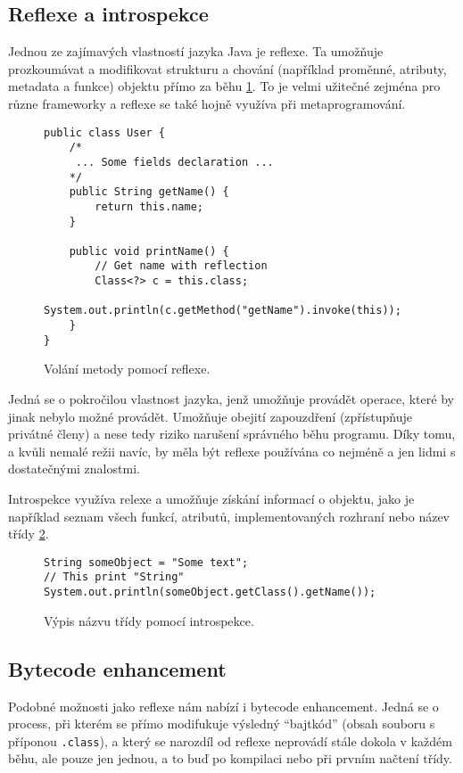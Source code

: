 \subsection{Reflexe a introspekce}
Jednou ze zajímavých vlastností jazyka Java je reflexe. Ta umožňuje prozkoumávat a modifikovat strukturu a chování (například proměnné, atributy, metadata a funkce) objektu přímo za běhu \ref{code:java:reflection}.
To je velmi užitečné zejména pro různe frameworky a reflexe se také hojně využíva při metaprogramování. 
\begin{figure}[!h]
\begin{lstlisting}
public class User {
    /*
     ... Some fields declaration ...
    */
    public String getName() {
        return this.name;
    }
    
    public void printName() {
        // Get name with reflection
        Class<?> c = this.class;
        System.out.println(c.getMethod("getName").invoke(this));
    }
}
\end{lstlisting}
\caption{Volání metody pomocí reflexe.}
\label{code:java:reflection}
\end{figure}

Jedná se o pokročilou vlastnost jazyka, jenž umožňuje provádět operace, které by jinak nebylo možné provádět. Umožňuje obejití zapouzdření (zpřístupňuje privátné členy) a nese tedy riziko narušení správného běhu programu. Díky tomu, a kvůli nemalé režii navíc, by měla být reflexe používána co nejméně a jen lidmi s dostatečnými znalostmi.

Introspekce využíva relexe a umožňuje získání informací o objektu, jako je například seznam všech funkcí, atributů, implementovaných rozhraní nebo název třídy \ref{code:java:introspection}.
\begin{figure}[!h]
\begin{lstlisting}
String someObject = "Some text";
// This print "String"
System.out.println(someObject.getClass().getName());
\end{lstlisting}
\caption{Výpis názvu třídy pomocí introspekce.}
\label{code:java:introspection}
\end{figure}
\subsection{Bytecode enhancement}
Podobné možnosti jako reflexe nám nabízí i bytecode enhancement. Jedná se o process, při kterém se přímo modifukuje výsledný "`bajtkód"' (obsah souboru s příponou \texttt{.class}), a který se narozdíl od reflexe neprovádí stále dokola v každém běhu, ale pouze jen jednou, a to buď po kompilaci nebo při prvním načtení třídy.

